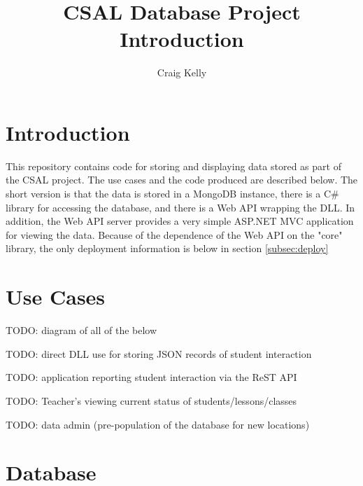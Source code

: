 \documentclass[letterpaper,10pt]{article}
\title{CSAL Database Project Introduction}
\author{Craig Kelly}
\begin{document}
\setlength{\pdfpageheight}{\paperheight}
\setlength{\pdfpagewidth}{\paperwidth}

\setlength{\parindent}{0pt}
\setlength{\parskip}{6pt}

\maketitle
\tableofcontents
\pagebreak


\section{Introduction}

This repository contains code for storing and displaying data stored as
part of the CSAL project.  The use cases and the code produced are described
below.  The short version is that the data is stored in a MongoDB instance,
there is a C\# library for accessing the database, and there is a Web API
wrapping the DLL.  In addition, the Web API server provides a very simple
ASP.NET MVC application for viewing the data.  Because of the dependence
of the Web API on the "core" library, the only deployment information is below
in section \ref{subsec:deploy} 


\section{Use Cases}

TODO: diagram of all of the below

TODO: direct DLL use for storing JSON records of student interaction

TODO: application reporting student interaction via the ReST API

TODO: Teacher's viewing current status of students/lessons/classes

TODO: data admin (pre-population of the database for new locations)


\section{Database}
\end{document}
